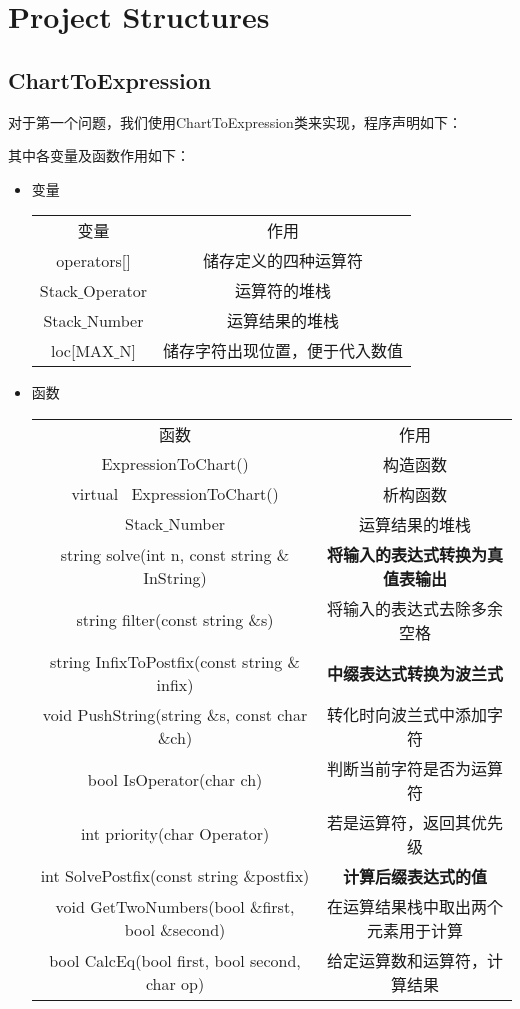 \section{Project Structures}
\subsection{ChartToExpression}

对于第一个问题，我们使用ChartToExpression类来实现，程序声明如下：



其中各变量及函数作用如下：

\begin{itemize}
	\item{变量}
	\begin{center}
		\begin{tabular}{cc}
			变量 & 作用 \\
			operators[] & 储存定义的四种运算符\\
			Stack$\_$Operator & 运算符的堆栈 \\
			Stack$\_$Number & 运算结果的堆栈 \\
			loc[MAX$\_$N] & 储存字符出现位置，便于代入数值\\
		\end{tabular}
	\end{center}
	\item{函数}
	\begin{center}
		\begin{tabular}{cc}
			函数 & 作用 \\
			ExpressionToChart() & 构造函数\\
			virtual ~ExpressionToChart() & 析构函数 \\
			Stack$\_$Number & 运算结果的堆栈 \\
			string solve(int n, const string $\&$InString) & 
			\textbf{将输入的表达式转换为真值表输出}\\
			string filter(const string $\&$s) &
			将输入的表达式去除多余空格\\
			string InfixToPostfix(const string $\&$infix) &
			\textbf{中缀表达式转换为波兰式}\\
			void PushString(string $\&$s, const char $\&$ch) &
			转化时向波兰式中添加字符\\
			bool IsOperator(char ch) &
			判断当前字符是否为运算符\\
			int priority(char Operator) &
			若是运算符，返回其优先级 \\
			int SolvePostfix(const string $\&$postfix) &
			\textbf{计算后缀表达式的值}\\
			void GetTwoNumbers(bool $\&$first, bool $\&$second) &
			在运算结果栈中取出两个元素用于计算\\
			bool CalcEq(bool first, bool second, char op) &
			给定运算数和运算符，计算结果\\
		\end{tabular}
	\end{center}
\end{itemize}
